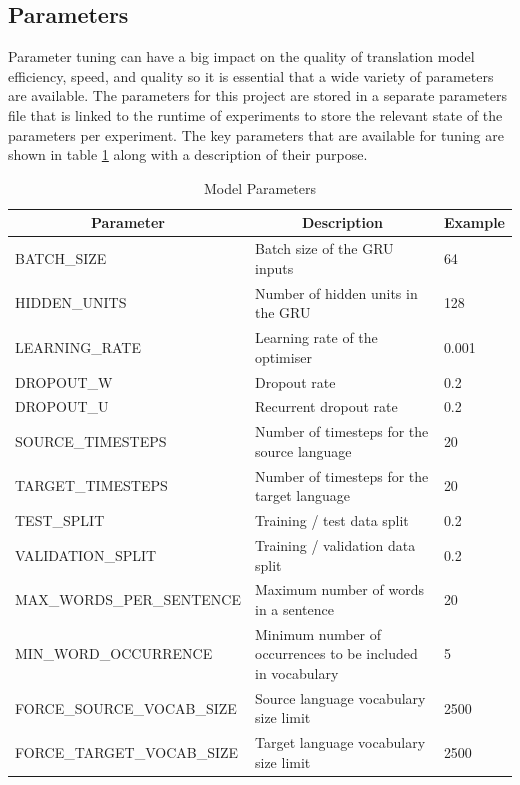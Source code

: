 \subsection{Parameters}

Parameter tuning can have a big impact on the quality of translation model efficiency, speed, and quality so it is essential that a wide variety of parameters are available. The parameters for this project are stored in a separate parameters file that is linked to the runtime of experiments to store the relevant state of the parameters per experiment. The key parameters that are available for tuning are shown in table \ref{tab:model-parameters} along with a description of their purpose.



\begin{table}[!ht]
\centering
\small
\begin{tabular}{|l|p{6.6cm}|l|}
\hline
\multicolumn{1}{|c|}{\textbf{Parameter}} & \multicolumn{1}{c|}{\textbf{Description}}                                       & \textbf{Example} \\ \hline
BATCH\_SIZE                & Batch size of the \acrshort{GRU} inputs            & 64    \\ \hline
HIDDEN\_UNITS              & Number of hidden units in the \acrshort{GRU}       & 128   \\ \hline
LEARNING\_RATE             & Learning rate of the optimiser                     & 0.001 \\ \hline
DROPOUT\_W                 & Dropout rate                                       & 0.2   \\ \hline
DROPOUT\_U                 & Recurrent dropout rate                             & 0.2   \\ \hline
SOURCE\_TIMESTEPS          & Number of timesteps for the source language        & 20    \\ \hline
TARGET\_TIMESTEPS          & Number of timesteps for the target language        & 20    \\ \hline
TEST\_SPLIT                & Training / test data split                         & 0.2   \\ \hline
VALIDATION\_SPLIT          & Training / validation data split                   & 0.2   \\ \hline
MAX\_WORDS\_PER\_SENTENCE  & Maximum number of words in a sentence              & 20    \\ \hline
MIN\_WORD\_OCCURRENCE      & Minimum number of occurrences to be included in vocabulary & 5 \\ \hline
FORCE\_SOURCE\_VOCAB\_SIZE & Source language vocabulary size limit              & 2500 \\ \hline
FORCE\_TARGET\_VOCAB\_SIZE & Target language vocabulary size limit              & 2500 \\ \hline
\end{tabular}
\captionsetup{justification=centering,font=Large}
\caption{Model Parameters}
\label{tab:model-parameters}
\end{table}

